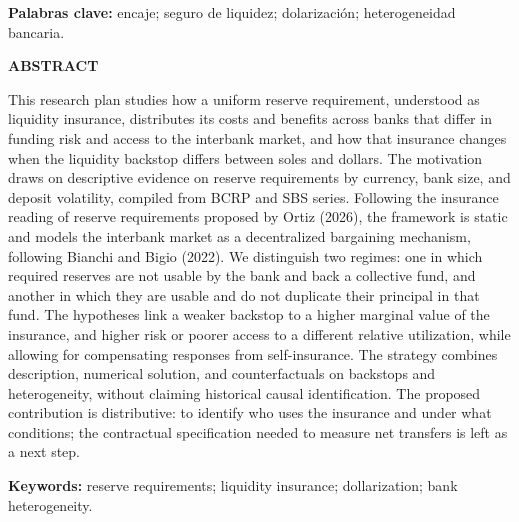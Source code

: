 \documentclass[11pt,a4paper]{article}
\begin{document}
\smallskip
\noindent\textbf{Palabras clave:} encaje; seguro de liquidez; dolarización; heterogeneidad bancaria.

\vspace{0.5cm}
\begin{center}\textbf{ABSTRACT}\end{center}
\noindent This research plan studies how a uniform reserve requirement, understood as liquidity insurance, distributes its costs and benefits across banks that differ in funding risk and access to the interbank market, and how that insurance changes when the liquidity backstop differs between soles and dollars. The motivation draws on descriptive evidence on reserve requirements by currency, bank size, and deposit volatility, compiled from BCRP and SBS series. Following the insurance reading of reserve requirements proposed by Ortiz (2026), the framework is static and models the interbank market as a decentralized bargaining mechanism, following Bianchi and Bigio (2022). We distinguish two regimes: one in which required reserves are not usable by the bank and back a collective fund, and another in which they are usable and do not duplicate their principal in that fund. The hypotheses link a weaker backstop to a higher marginal value of the insurance, and higher risk or poorer access to a different relative utilization, while allowing for compensating responses from self-insurance. The strategy combines description, numerical solution, and counterfactuals on backstops and heterogeneity, without claiming historical causal identification. The proposed contribution is distributive: to identify who uses the insurance and under what conditions; the contractual specification needed to measure net transfers is left as a next step.

\smallskip
\noindent\textbf{Keywords:} reserve requirements; liquidity insurance; dollarization; bank heterogeneity.
\clearpage
\end{document}
